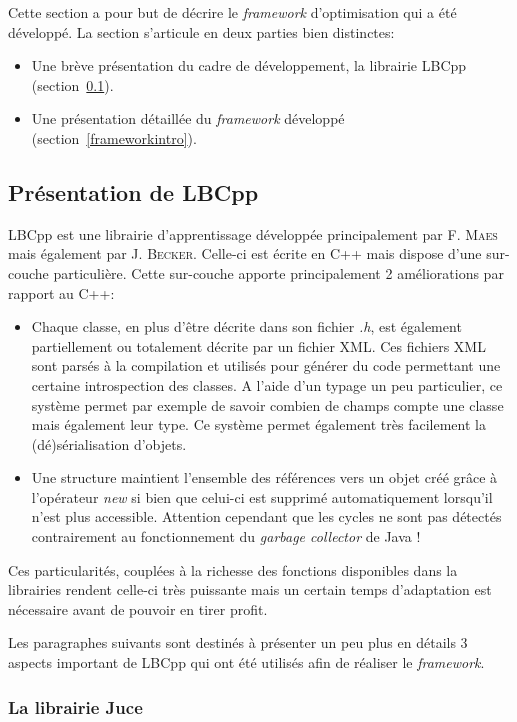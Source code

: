 \documentclass[a4paper, 11pt]{report}
\begin{document}
Cette section a pour but de décrire le \textit{framework} d'optimisation qui a été développé. La section s'articule en deux parties bien distinctes: %
\begin{itemize}
\item Une brève présentation du cadre de développement, la librairie LBCpp (section~\ref{LBCpp}).
\item Une présentation détaillée du \textit{framework} développé (section~\ref{frameworkintro}).
\end{itemize}

\subsection{Présentation de LBCpp}
\label{LBCpp}
LBCpp est une librairie d'apprentissage développée principalement par F. \textsc{Maes} mais également par J. \textsc{Becker}. Celle-ci est écrite en C++ mais dispose d'une sur-couche particulière. Cette sur-couche apporte principalement 2 améliorations par rapport au C++:
\begin{itemize}
\item Chaque classe, en plus d'être décrite dans son fichier \textit{.h}, est également partiellement ou totalement décrite par un fichier XML. Ces fichiers XML sont parsés à la compilation et utilisés pour générer du code permettant une certaine introspection des classes. A l'aide d'un typage un peu particulier, ce système permet par exemple de savoir combien de champs compte une classe mais également leur type. Ce système permet également très facilement la (dé)sérialisation d'objets.
\item Une structure maintient l'ensemble des références vers un objet créé grâce à l'opérateur \textit{new} si bien que celui-ci est supprimé automatiquement lorsqu'il n'est plus accessible. Attention cependant que les cycles ne sont pas détectés contrairement au fonctionnement du \textit{garbage collector} de Java !
\end{itemize}
Ces particularités, couplées à la richesse des fonctions disponibles dans la librairies rendent celle-ci très puissante mais un certain temps d'adaptation est nécessaire avant de pouvoir en tirer profit.

Les paragraphes suivants sont destinés  à présenter un peu plus en détails 3 aspects important de LBCpp qui ont été utilisés afin de réaliser le \textit{framework}.

\subsubsection{La librairie Juce}
\end{document}
